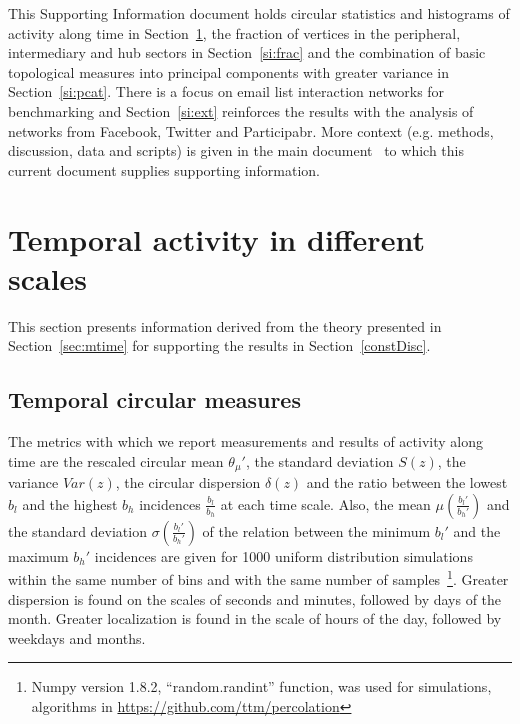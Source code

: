 \documentclass[%
 aip,
 jmp,%
 amsmath,amssymb,
 reprint,%
 floatfix,
]{revtex4-1}
\begin{document}
\date{\today}%

\maketitle

\tableofcontents


\vfill
\newpage

This Supporting Information document holds circular statistics and histograms of activity along time in Section~\ref{sec:time},
the fraction of vertices in the peripheral, intermediary and hub sectors in Section~\ref{si:frac}
and the combination of basic topological measures into principal components with greater variance in Section~\ref{si:pcat}.
There is a focus on email list interaction networks for benchmarking and
Section~\ref{si:ext} reinforces the results with the analysis of networks from Facebook, Twitter and Participabr.
More context (e.g. methods, discussion, data and scripts) is given in the main document~\cite{tpaper}
to which this current document supplies supporting information.

\section{Temporal activity in different scales}\label{sec:time}
This section presents information derived from the theory presented in Section~\ref*{sec:mtime}
for supporting the results in Section~\ref*{constDisc}.

\subsection{Temporal circular measures}\label{si:circ}
The metrics with which we report measurements and results
of activity along time are the rescaled circular mean $\theta_\mu'$,
the standard deviation $S(z)$, the variance $Var(z)$, the circular dispersion $\delta(z)$
and the ratio between the lowest $b_l$ and the highest $b_h$ incidences $\frac{b_l}{b_h}$ at each time scale.
Also, the mean $\mu(\frac{b_l'}{b_h'})$ and 
the standard deviation $\sigma(\frac{b_l'}{b_h'})$ 
of the relation between the minimum $b_l'$ and the maximum $b_h'$ incidences
are given for 1000 uniform distribution simulations within the 
same number of bins and with the same number of samples~\footnote{Numpy version 1.8.2, ``random.randint'' function, was used for simulations, algorithms in \url{https://github.com/ttm/percolation}}.
Greater dispersion is found on the scales of seconds and minutes, followed
by days of the month.
Greater localization is found in the scale of hours of the day, followed by weekdays and months.
\end{document}
